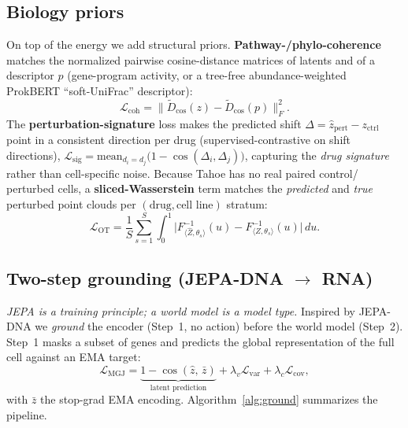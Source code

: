 \documentclass[10pt,twocolumn]{article}
\DeclareMathOperator{\cossim}{cos}
\newcommand{\zctrl}{z_{\mathrm{ctrl}}}
\newcommand{\zhat}{\hat{z}_{\mathrm{pert}}}
\begin{document}
\subsection{Biology priors}
On top of the energy we add structural priors. \textbf{Pathway-/phylo-coherence} matches the
normalized pairwise cosine-distance matrices of latents and of a descriptor $p$ (gene-program activity,
or a tree-free abundance-weighted ProkBERT ``soft-UniFrac'' descriptor):
\begin{equation}
\mathcal{L}_{\mathrm{coh}}=\big\lVert \tilde D_{\cos}(z)-\tilde D_{\cos}(p)\big\rVert_F^2 .
\label{eq:coh}
\end{equation}
The \textbf{perturbation-signature} loss makes the predicted shift $\Delta=\zhat-\zctrl$ point in a
consistent direction per drug (supervised-contrastive on shift directions),
$\mathcal{L}_{\mathrm{sig}}=\mathrm{mean}_{d_i=d_j}\!\big(1-\cossim(\Delta_i,\Delta_j)\big)$, capturing
the \emph{drug signature} rather than cell-specific noise. Because Tahoe has no real paired control/
perturbed cells, a \textbf{sliced-Wasserstein} term matches the \emph{predicted} and \emph{true}
perturbed point clouds per $(\text{drug},\text{cell line})$ stratum:
\begin{equation}
\mathcal{L}_{\mathrm{OT}}=\frac1S\sum_{s=1}^{S}\!\int_0^1\!\!\big|F^{-1}_{\langle \hat Z,\theta_s\rangle}(u)
- F^{-1}_{\langle Z,\theta_s\rangle}(u)\big|\,du .
\label{eq:sw}
\end{equation}

\subsection{Two-step grounding (JEPA-DNA $\to$ RNA)}
\emph{JEPA is a training principle; a world model is a model type.} Inspired by JEPA-DNA we
\emph{ground} the encoder (Step~1, no action) before the world model (Step~2). Step~1 masks a subset of
genes and predicts the global representation of the full cell against an EMA target:
\begin{equation}
\mathcal{L}_{\mathrm{MGJ}}=\underbrace{1-\cossim(\hat z,\,\bar z)}_{\text{latent prediction}}
+\lambda_v\mathcal{L}_{\mathrm{var}}+\lambda_c\mathcal{L}_{\mathrm{cov}},
\label{eq:mgj}
\end{equation}
with $\bar z$ the stop-grad EMA encoding. Algorithm~\ref{alg:ground} summarizes the pipeline.
\end{document}
